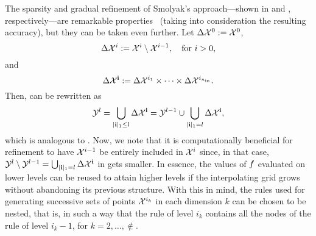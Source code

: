 The sparsity and gradual refinement of Smolyak's approach---shown in
 and , respectively---are
remarkable properties \perse\ (taking into consideration the resulting
accuracy), but they can be taken even further. Let $\Delta\mathcal{X}^0 := \mathcal{X}^0$,
\[
  \Delta\mathcal{X}^i := \mathcal{X}^i \setminus \mathcal{X}^{i - 1}, \quad \text{for $i > 0$,}
\]
and
\[
  \Delta\mathcal{X}^{\mathbf{i}} := \Delta\mathcal{X}^{i_1} \times \cdots \times \Delta\mathcal{X}^{i_{n_\text{in}}}.
\]
Then,  can be rewritten as
\begin{equation} \elab{smolyak-grid-incremental}
  \Y^l = \bigcup_{|\vi|_1 \leq l} \Delta\X^\vi = \Y^{l - 1} \cup \bigcup_{|\vi|_1 = l} \Delta\X^\vi,
\end{equation}
which is analogous to . Now, we note that it is
computationally beneficial for refinement to have $\mathcal{X}^{i - 1}$ be entirely
included in $\mathcal{X}^i$ since, in that case, $\mathcal{Y}^l \setminus \mathcal{Y}^{l - 1} =
\bigcup_{|\mathbf{i}|_1 = l} \Delta\mathcal{X}^{\mathbf{i}}$ in  gets
smaller. In essence, the values of $f$ evaluated on lower levels can be reused
to attain higher levels if the interpolating grid grows without abandoning its
previous structure. With this in mind, the rules used for generating successive
sets of points $\mathcal{X}^{i_k}$ in each dimension $k$ can be chosen to be nested, that
is, in such a way that the rule of level $i_k$ contains all the nodes of the
rule of level $i_k - 1$, for $k = 2, \dots, \nin$.

